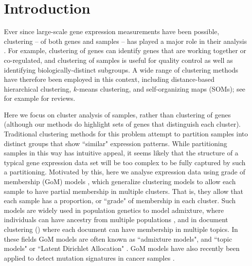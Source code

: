 \section{Introduction}

Ever since large-scale gene expression measurements have been possible, clustering -- of both genes and samples -- 
has played a major role in their analysis \cite{Eisen1998}\cite{Golub1999} \cite{Alizadeh2000}.
For example, clustering of genes can identify genes that are working together or co-regulated, and clustering of samples is useful for quality control 
as well as identifying biologically-distinct subgroups. A wide range of clustering methods have therefore
been employed in this context, including distance-based hierarchical clustering, $k$-means clustering, and self-organizing maps (SOMs); see for example \cite{D'haeseleer2005} \cite{Jiang2004} for reviews. 

Here we focus on cluster analysis of samples, rather than clustering of genes (although our methods do highlight sets of genes that distinguish each cluster). 
Traditional clustering methods for this problem attempt to partition samples into distinct groups that show ``similar" expression patterns. 
While partitioning samples in this way has intuitive appeal, 
it seems likely that the structure of a typical gene expression data set will be too complex to be fully captured by such a partitioning. 
Motivated by this, here we analyse expression data using grade of membership (GoM) models \cite{Erosheva2006}, which generalize clustering models 
to allow each sample to have partial membership in multiple clusters.
That is, they allow that each sample has a proportion, or ``grade" of membership in each cluster. Such
models are widely used in population genetics to model admixture, where individuals can have ancestry from multiple populations \cite{Pritchard2000},
and in document clustering (\cite{Blei2003,Blei2009}) where each document can have membership in multiple topics. In these fields
GoM models are often known as ``admixture models", and ``topic models" or ``Latent Dirichlet Allocation" \cite{Blei2003}. GoM models have also recently
been applied to detect mutation signatures in cancer samples \cite{Shiraishi2015}. 




